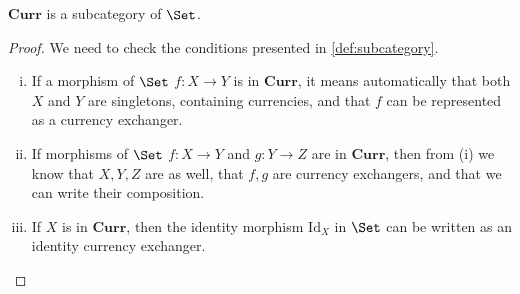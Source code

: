\begin{lemma}
    $\mathbf{Curr}$ is a subcategory of $\Set$.
\end{lemma}

\begin{proof}
    We need to check the conditions presented in \cref{def:subcategory}.
    \begin{enumerate}[(i)]
        \item If a morphism of $\Set$ $f\colon X\to Y$ is in $\mathbf{Curr}$, it means automatically that both $X$ and $Y$ are singletons, containing currencies, and that $f$ can be represented as a currency exchanger.
        \item If morphisms of $\Set$ $f\colon X\to Y$ and $g\colon Y \to Z$ are in $\mathbf{Curr}$, then from (i) we know that $X,Y,Z$ are as well, that $f,g$ are currency exchangers, and that we can write their composition.
        \item If $X$ is in $\mathbf{Curr}$, then the identity morphism $\text{Id}_X$ in $\Set$ can be written as an identity currency exchanger.
    \end{enumerate}
\end{proof}
    

